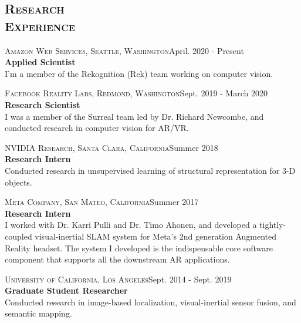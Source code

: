 \documentclass[margin, line, 10pt]{res} %
\begin{document}
\begin{resume}
\section{\textsc{Research\\Experience}}

\textsc{Amazon Web Services, Seattle, Washington}\hfill April. 2020 - Present \\
\textbf{Applied Scientist}\\ 
I'm a member of the Rekognition (Rek) team working on computer vision.

\textsc{Facebook Reality Labs, Redmond, Washington}\hfill Sept. 2019 - March 2020 \\
\textbf{Research Scientist}\\
I was a member of the Surreal team led by Dr. Richard Newcombe, and conducted research in computer vision for AR/VR.

\textsc{NVIDIA Research, Santa Clara, California}\hfill Summer 2018\\
\textbf{Research Intern}\\
Conducted research in unsupervised learning of structural representation for 3-D objects.

\textsc{Meta Company, San Mateo, California}\hfill Summer 2017\\
\textbf{Research Intern}\\
I worked with Dr. Karri Pulli and Dr. Timo Ahonen, and developed a tightly-coupled visual-inertial SLAM system for Meta's 2nd generation Augmented Reality headset. The system I developed is the indispensable core software component that supports all the downstream AR applications.

\textsc{University of California, Los Angeles}\hfill Sept. 2014 - Sept. 2019\\
\textbf{Graduate Student Researcher}\\
Conducted research in image-based localization, visual-inertial sensor fusion, and semantic mapping.





\end{resume}
\end{document}
